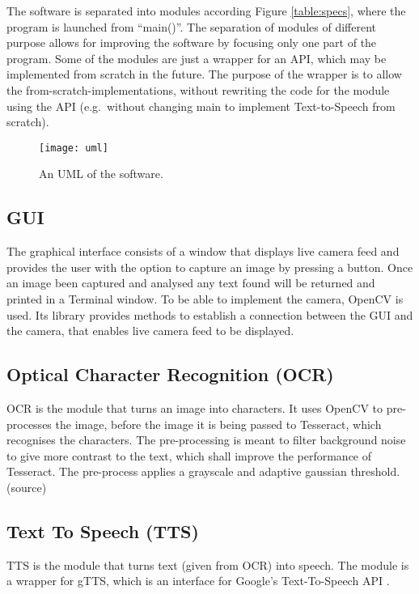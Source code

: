 \documentclass[../main.tex]{subfiles}
\begin{document}
The software is separated into modules according Figure \ref{table:specs}, where the
program is launched from ``main()''. The separation of modules of different
purpose allows for improving the software by focusing only one part of the
program. Some of the modules are just a wrapper for an API, which may be
implemented from scratch in the future. The purpose of the wrapper is to allow
the from-scratch-implementations, without rewriting the code for the module
using the API (e.g.\ without changing main to implement Text-to-Speech from
scratch).

\begin{figure}[ht!]
  \centering
  \caption{An UML of the software.\label{fig:uml}}
  \texttt{[image: uml]}
\end{figure}

\subsection{GUI}
The graphical interface consists of a window that displays live camera feed and provides the user with the option to capture an image by pressing a button. Once an image been captured and analysed any text found will be returned and printed in a Terminal window. To be able to implement the camera, OpenCV is used. Its library provides methods to establish a connection between the GUI and the camera, that enables live camera feed to be displayed.

\subsection{Optical Character Recognition (OCR)}

OCR is the module that turns an image into characters. It uses OpenCV to pre-processes the image, before the image it is being passed to Tesseract, which recognises the characters. The pre-processing is meant to filter background noise to give more contrast to the text, which shall improve the performance of Tesseract. The pre-process applies a grayscale and adaptive gaussian threshold. (source) %

\subsection{Text To Speech (TTS)}

TTS is the module that turns text (given from OCR) into speech. The module is a wrapper for gTTS, which is an interface for Google’s Text-To-Speech API \cite{github_gTTS}.
\end{document}
